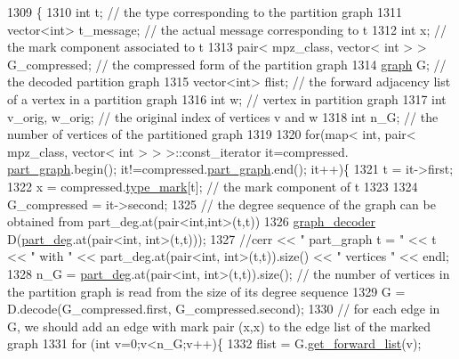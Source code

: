 \begin{DoxyCode}
1309 \{
1310   \textcolor{keywordtype}{int} t; \textcolor{comment}{// the type corresponding to the partition graph}
1311   vector<int> t\_message; \textcolor{comment}{// the actual message corresponding to t}
1312   \textcolor{keywordtype}{int} x; \textcolor{comment}{// the mark component associated to t}
1313   pair< mpz\_class, vector< int > > G\_compressed; \textcolor{comment}{// the compressed form of the partition graph}
1314   \hyperlink{classgraph}{graph} G; \textcolor{comment}{// the decoded partition graph}
1315   vector<int> flist; \textcolor{comment}{// the forward adjacency list of a vertex in a partition graph}
1316   \textcolor{keywordtype}{int} w; \textcolor{comment}{// vertex in partition graph}
1317   \textcolor{keywordtype}{int} v\_orig, w\_orig; \textcolor{comment}{// the original index of vertices v and w}
1318   \textcolor{keywordtype}{int} n\_G; \textcolor{comment}{// the number of vertices of the partitioned graph }
1319 
1320   \textcolor{keywordflow}{for}(map< \textcolor{keywordtype}{int}, pair< mpz\_class, vector< int > > >::const\_iterator it=compressed.
      \hyperlink{classmarked__graph__compressed_ae179a4737e6eab905c18a94d44ef64b7}{part\_graph}.begin(); it!=compressed.\hyperlink{classmarked__graph__compressed_ae179a4737e6eab905c18a94d44ef64b7}{part\_graph}.end(); it++)\{
1321     t = it->first;
1322     x = compressed.\hyperlink{classmarked__graph__compressed_a86b00223525703e973415cbc9c94da68}{type\_mark}[t]; \textcolor{comment}{// the mark component of t }
1323 
1324     G\_compressed = it->second;
1325     \textcolor{comment}{// the degree sequence of the graph can be obtained from part\_deg.at(pair<int,int>(t,t))}
1326     \hyperlink{classgraph__decoder}{graph\_decoder} D(\hyperlink{classmarked__graph__decoder_a6882e96fcad9abb10e72f1398814824a}{part\_deg}.at(pair<int, int>(t,t)));
1327     \textcolor{comment}{//cerr << " part\_graph t = " << t << " with " << part\_deg.at(pair<int, int>(t,t)).size() << " vertices
       " << endl;}
1328     n\_G = \hyperlink{classmarked__graph__decoder_a6882e96fcad9abb10e72f1398814824a}{part\_deg}.at(pair<int, int>(t,t)).size(); \textcolor{comment}{// the number of vertices in the partition graph
       is read from the size of its degree sequence}
1329     G = D.decode(G\_compressed.first, G\_compressed.second);
1330     \textcolor{comment}{// for each edge in G, we should add an edge with mark pair (x,x) to the edge list of the marked graph}
1331     \textcolor{keywordflow}{for} (\textcolor{keywordtype}{int} v=0;v<n\_G;v++)\{
1332       flist = G.\hyperlink{classgraph_aa8fbee52a7b3604dbbd9175040c7ead5}{get\_forward\_list}(v);

\end{DoxyCode}

